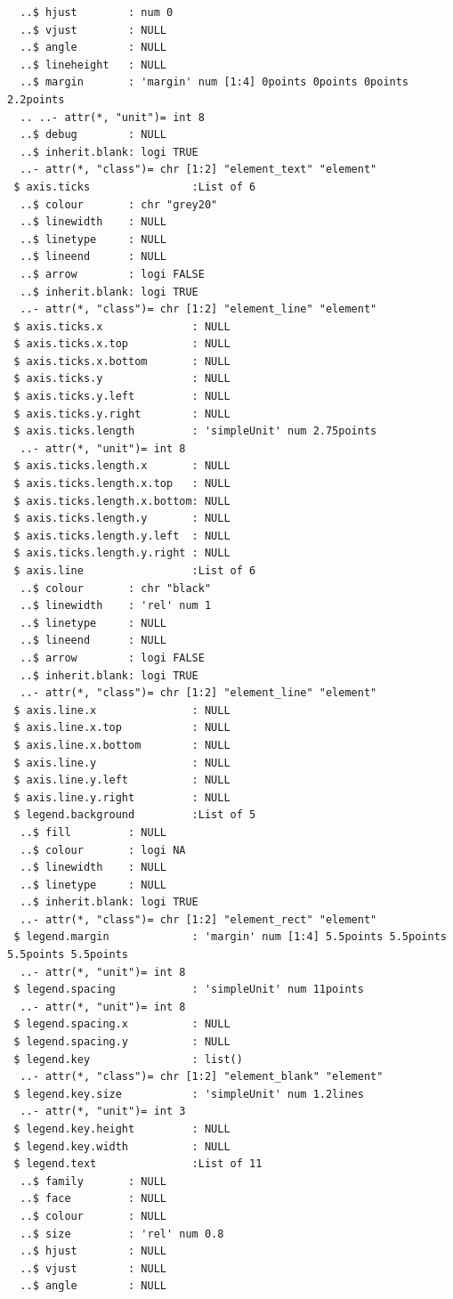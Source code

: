 \documentclass[
  letterpaper,
  DIV=11,
  numbers=noendperiod]{scrartcl}
\begin{document}
\begin{verbatim}
  ..$ hjust        : num 0
  ..$ vjust        : NULL
  ..$ angle        : NULL
  ..$ lineheight   : NULL
  ..$ margin       : 'margin' num [1:4] 0points 0points 0points 2.2points
  .. ..- attr(*, "unit")= int 8
  ..$ debug        : NULL
  ..$ inherit.blank: logi TRUE
  ..- attr(*, "class")= chr [1:2] "element_text" "element"
 $ axis.ticks                :List of 6
  ..$ colour       : chr "grey20"
  ..$ linewidth    : NULL
  ..$ linetype     : NULL
  ..$ lineend      : NULL
  ..$ arrow        : logi FALSE
  ..$ inherit.blank: logi TRUE
  ..- attr(*, "class")= chr [1:2] "element_line" "element"
 $ axis.ticks.x              : NULL
 $ axis.ticks.x.top          : NULL
 $ axis.ticks.x.bottom       : NULL
 $ axis.ticks.y              : NULL
 $ axis.ticks.y.left         : NULL
 $ axis.ticks.y.right        : NULL
 $ axis.ticks.length         : 'simpleUnit' num 2.75points
  ..- attr(*, "unit")= int 8
 $ axis.ticks.length.x       : NULL
 $ axis.ticks.length.x.top   : NULL
 $ axis.ticks.length.x.bottom: NULL
 $ axis.ticks.length.y       : NULL
 $ axis.ticks.length.y.left  : NULL
 $ axis.ticks.length.y.right : NULL
 $ axis.line                 :List of 6
  ..$ colour       : chr "black"
  ..$ linewidth    : 'rel' num 1
  ..$ linetype     : NULL
  ..$ lineend      : NULL
  ..$ arrow        : logi FALSE
  ..$ inherit.blank: logi TRUE
  ..- attr(*, "class")= chr [1:2] "element_line" "element"
 $ axis.line.x               : NULL
 $ axis.line.x.top           : NULL
 $ axis.line.x.bottom        : NULL
 $ axis.line.y               : NULL
 $ axis.line.y.left          : NULL
 $ axis.line.y.right         : NULL
 $ legend.background         :List of 5
  ..$ fill         : NULL
  ..$ colour       : logi NA
  ..$ linewidth    : NULL
  ..$ linetype     : NULL
  ..$ inherit.blank: logi TRUE
  ..- attr(*, "class")= chr [1:2] "element_rect" "element"
 $ legend.margin             : 'margin' num [1:4] 5.5points 5.5points 5.5points 5.5points
  ..- attr(*, "unit")= int 8
 $ legend.spacing            : 'simpleUnit' num 11points
  ..- attr(*, "unit")= int 8
 $ legend.spacing.x          : NULL
 $ legend.spacing.y          : NULL
 $ legend.key                : list()
  ..- attr(*, "class")= chr [1:2] "element_blank" "element"
 $ legend.key.size           : 'simpleUnit' num 1.2lines
  ..- attr(*, "unit")= int 3
 $ legend.key.height         : NULL
 $ legend.key.width          : NULL
 $ legend.text               :List of 11
  ..$ family       : NULL
  ..$ face         : NULL
  ..$ colour       : NULL
  ..$ size         : 'rel' num 0.8
  ..$ hjust        : NULL
  ..$ vjust        : NULL
  ..$ angle        : NULL

\end{verbatim}
\end{document}
